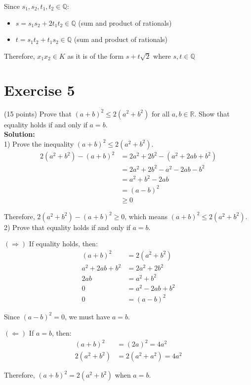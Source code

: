 \documentclass{article}
\begin{document}
Since $s_1, s_2, t_1, t_2 \in \mathbb{Q}$:
\begin{itemize}
\item $s = s_1s_2 + 2t_1t_2 \in \mathbb{Q}$ (sum and product of rationals)
\item $t = s_1t_2 + t_1s_2 \in \mathbb{Q}$ (sum and product of rationals)
\end{itemize}

Therefore, $x_1x_2 \in K$ as it is of the form $s + t\sqrt{2}$ where $s, t \in \mathbb{Q}$

\newpage

\section*{Exercise 5}
(15 points) Prove that $(a + b)^2 \leq 2(a^2 + b^2)$ for all $a,b \in \mathbb{R}$. Show that equality holds if and only if $a = b$. \\

\textbf{Solution:} \\

1) Prove the inequality $(a + b)^2 \leq 2(a^2 + b^2)$.
\begin{align*}
2(a^2 + b^2) - (a + b)^2 &= 2a^2 + 2b^2 - (a^2 + 2ab + b^2) \\
&= 2a^2 + 2b^2 - a^2 - 2ab - b^2 \\
&= a^2 + b^2 - 2ab \\
&= (a - b)^2 \\
&\geq 0
\end{align*}

Therefore, $2(a^2 + b^2) - (a + b)^2 \geq 0$, which means $(a + b)^2 \leq 2(a^2 + b^2)$. \\

2) Prove that equality holds if and only if $a = b$.

$(\Rightarrow)$ If equality holds, then:
\begin{align*}
(a + b)^2 &= 2(a^2 + b^2) \\
a^2 + 2ab + b^2 &= 2a^2 + 2b^2 \\
2ab &= a^2 + b^2 \\
0 &= a^2 - 2ab + b^2 \\
0 &= (a - b)^2
\end{align*}

Since $(a - b)^2 = 0$, we must have $a = b$.

$(\Leftarrow)$ If $a = b$, then:
\begin{align*}
(a + b)^2 &= (2a)^2 = 4a^2 \\
2(a^2 + b^2) &= 2(a^2 + a^2) = 4a^2
\end{align*}

Therefore, $(a + b)^2 = 2(a^2 + b^2)$ when $a = b$.
\end{document}

